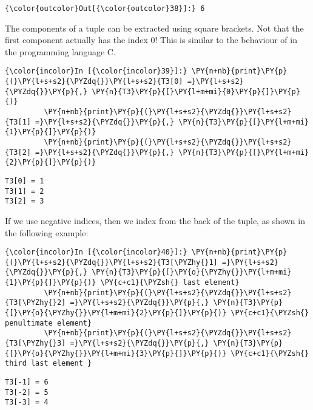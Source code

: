 \begin{Verbatim}[commandchars=\\\{\}]
{\color{outcolor}Out[{\color{outcolor}38}]:} 6
\end{Verbatim}
            
The components of a tuple can be extracted using square brackets. Not
that the first component actually has the index \(0\)! This is similar
to the behaviour of  in the programming language C.

\begin{Verbatim}[commandchars=\\\{\}]
{\color{incolor}In [{\color{incolor}39}]:} \PY{n+nb}{print}\PY{p}{(}\PY{l+s+s2}{\PYZdq{}}\PY{l+s+s2}{T3[0] =}\PY{l+s+s2}{\PYZdq{}}\PY{p}{,} \PY{n}{T3}\PY{p}{[}\PY{l+m+mi}{0}\PY{p}{]}\PY{p}{)}
         \PY{n+nb}{print}\PY{p}{(}\PY{l+s+s2}{\PYZdq{}}\PY{l+s+s2}{T3[1] =}\PY{l+s+s2}{\PYZdq{}}\PY{p}{,} \PY{n}{T3}\PY{p}{[}\PY{l+m+mi}{1}\PY{p}{]}\PY{p}{)}
         \PY{n+nb}{print}\PY{p}{(}\PY{l+s+s2}{\PYZdq{}}\PY{l+s+s2}{T3[2] =}\PY{l+s+s2}{\PYZdq{}}\PY{p}{,} \PY{n}{T3}\PY{p}{[}\PY{l+m+mi}{2}\PY{p}{]}\PY{p}{)}
\end{Verbatim}

\begin{Verbatim}[commandchars=\\\{\}]
T3[0] = 1
T3[1] = 2
T3[2] = 3
\end{Verbatim}
If we use negative indices, then we index from the back of the tuple, as
shown in the following example:

\begin{Verbatim}[commandchars=\\\{\}]
{\color{incolor}In [{\color{incolor}40}]:} \PY{n+nb}{print}\PY{p}{(}\PY{l+s+s2}{\PYZdq{}}\PY{l+s+s2}{T3[\PYZhy{}1] =}\PY{l+s+s2}{\PYZdq{}}\PY{p}{,} \PY{n}{T3}\PY{p}{[}\PY{o}{\PYZhy{}}\PY{l+m+mi}{1}\PY{p}{]}\PY{p}{)} \PY{c+c1}{\PYZsh{} last element}
         \PY{n+nb}{print}\PY{p}{(}\PY{l+s+s2}{\PYZdq{}}\PY{l+s+s2}{T3[\PYZhy{}2] =}\PY{l+s+s2}{\PYZdq{}}\PY{p}{,} \PY{n}{T3}\PY{p}{[}\PY{o}{\PYZhy{}}\PY{l+m+mi}{2}\PY{p}{]}\PY{p}{)} \PY{c+c1}{\PYZsh{} penultimate element}
         \PY{n+nb}{print}\PY{p}{(}\PY{l+s+s2}{\PYZdq{}}\PY{l+s+s2}{T3[\PYZhy{}3] =}\PY{l+s+s2}{\PYZdq{}}\PY{p}{,} \PY{n}{T3}\PY{p}{[}\PY{o}{\PYZhy{}}\PY{l+m+mi}{3}\PY{p}{]}\PY{p}{)} \PY{c+c1}{\PYZsh{} third last element }
\end{Verbatim}

\begin{Verbatim}[commandchars=\\\{\}]
T3[-1] = 6
T3[-2] = 5
T3[-3] = 4
\end{Verbatim}

